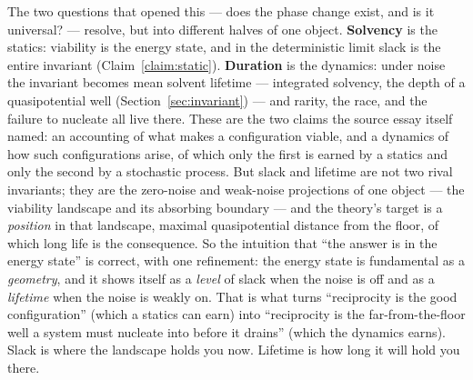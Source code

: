 \documentclass[11pt]{article}
\theoremstyle{plain}
\theoremstyle{definition}
\begin{document}
The two questions that opened this --- does the phase change exist, and is it universal? --- resolve, but into different halves of one object. \textbf{Solvency} is the statics: viability is the energy state, and in the deterministic limit slack is the entire invariant (Claim~\ref{claim:static}). \textbf{Duration} is the dynamics: under noise the invariant becomes mean solvent lifetime --- integrated solvency, the depth of a quasipotential well (Section~\ref{sec:invariant}) --- and rarity, the race, and the failure to nucleate all live there. These are the two claims the source essay itself named: an accounting of what makes a configuration viable, and a dynamics of how such configurations arise, of which only the first is earned by a statics and only the second by a stochastic process. But slack and lifetime are not two rival invariants; they are the zero-noise and weak-noise projections of one object --- the viability landscape and its absorbing boundary --- and the theory's target is a \emph{position} in that landscape, maximal quasipotential distance from the floor, of which long life is the consequence. So the intuition that ``the answer is in the energy state'' is correct, with one refinement: the energy state is fundamental as a \emph{geometry}, and it shows itself as a \emph{level} of slack when the noise is off and as a \emph{lifetime} when the noise is weakly on. That is what turns ``reciprocity is the good configuration'' (which a statics can earn) into ``reciprocity is the far-from-the-floor well a system must nucleate into before it drains'' (which the dynamics earns). Slack is where the landscape holds you now. Lifetime is how long it will hold you there.
\end{document}
